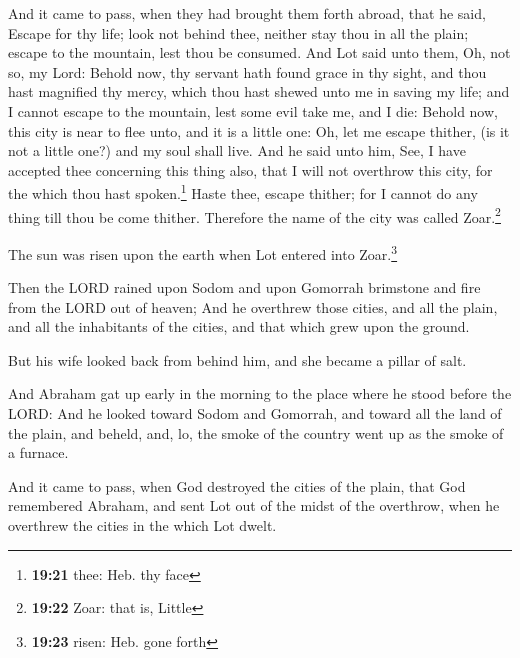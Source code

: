  And it came to pass, when they had brought them forth
abroad, that he said, Escape for thy life; look not behind thee, neither
stay thou in all the plain; escape to the mountain, lest thou be
consumed.  And Lot said unto them, Oh, not so, my Lord:
 Behold now, thy servant hath found grace in thy sight,
and thou hast magnified thy mercy, which thou hast shewed unto me in
saving my life; and I cannot escape to the mountain, lest some evil take
me, and I die:  Behold now, this city is near to flee
unto, and it is a little one: Oh, let me escape thither, (is it not a
little one?) and my soul shall live.  And he said unto
him, See, I have accepted thee concerning this thing also, that I will
not overthrow this city, for the which thou hast spoken.\footnote{\textbf{19:21}
  thee: Heb. thy face}  Haste thee, escape thither; for I
cannot do any thing till thou be come thither. Therefore the name of the
city was called Zoar.\footnote{\textbf{19:22} Zoar: that is, Little}

 The sun was risen upon the earth when Lot entered into
Zoar.\footnote{\textbf{19:23} risen: Heb. gone forth}

 Then the LORD rained upon Sodom and upon Gomorrah
brimstone and fire from the LORD out of heaven;  And he
overthrew those cities, and all the plain, and all the inhabitants of
the cities, and that which grew upon the ground.

 But his wife looked back from behind him, and she became
a pillar of salt.

 And Abraham gat up early in the morning to the place
where he stood before the LORD:  And he looked toward
Sodom and Gomorrah, and toward all the land of the plain, and beheld,
and, lo, the smoke of the country went up as the smoke of a furnace.

 And it came to pass, when God destroyed the cities of
the plain, that God remembered Abraham, and sent Lot out of the midst of
the overthrow, when he overthrew the cities in the which Lot dwelt.

